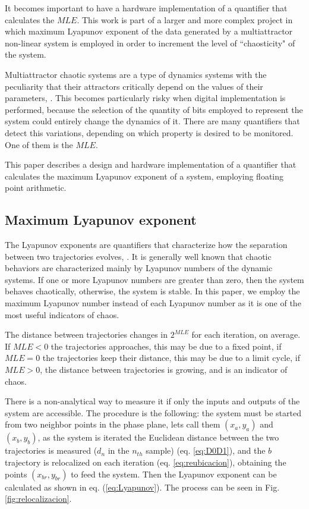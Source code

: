 It becomes important to have a hardware implementation of a
quantifier that calculates the $MLE$. This work is part of a
larger and more complex project in which maximum Lyapunov exponent
of the data generated by a multiattractor non-linear system is
employed in order to increment the level of ``chaosticity" of the
system.

Multiattractor chaotic systems are a type of dynamics systems with
the peculiarity that their attractors critically depend on the
values of their parameters, \cite{strotgartz1994,Sprott2003}. This
becomes particularly risky when digital implementation is
performed, because the selection of the quantity of bits employed
to represent the system could entirely change the dynamics of it.
There are many quantifiers that detect this variations, depending
on which property is desired to be monitored. One of them is the
$MLE$.

This paper describes a design and hardware implementation of a
quantifier that calculates the maximum Lyapunov exponent of a
system, employing floating point arithmetic.


\subsection{Maximum Lyapunov exponent}

The Lyapunov exponents are quantifiers that characterize how the
separation between two trajectories evolves, \cite{Sprott2003}. It
is generally well known that chaotic behaviors are characterized
mainly by Lyapunov numbers of the dynamic systems. If one or more
Lyapunov numbers are greater than zero, then the system behaves
chaotically, otherwise, the system is stable. In this paper, we
employ the maximum Lyapunov number instead of each
Lyapunov number as it is one of the most useful indicators of
chaos.

The distance between trajectories changes in $2^{MLE}$ for each
iteration, on average. If $MLE<0$ the trajectories approaches,
this may be due to a fixed point, if $MLE=0$ the trajectories keep
their distance, this may be due to a limit cycle, if $MLE>0$, the
distance between trajectories is growing, and is an indicator of
chaos. \cite{Sprott2003}

There is a non-analytical way to measure it if only the inputs and
outputs of the system are accessible. The procedure is the
following: the system must be started from two neighbor points in
the phase plane, lets call them $(x_a,y_a)$ and $(x_b,y_b)$, as
the system is iterated the Euclidean distance between the two
trajectories is measured ($d_n$ in the $n_{th}$ sample) (eq.
\ref{eq:D0D1}), and the $b$ trajectory is relocalized on each
iteration  (eq. \ref{eq:reubicacion}), obtaining the points
$(x_{br},y_{br})$ to feed the system. Then the Lyapunov exponent
can be calculated as shown in eq. (\ref{eq:Lyapunov}). The process
can be seen in Fig. \ref{fig:relocalizacion}.


